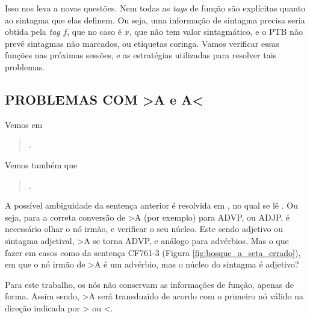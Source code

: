 Isso nos leva a novas questões. Nem todas as \textit{tags} de função são explícitas quanto ao sintagma que elas definem. Ou seja, uma informação de sintagma precisa seria obtida pela \textit{tag} $f$, que no caso é $x$, que não tem valor sintagmático, e o PTB não prevê sintagmas não marcados, ou etiquetas coringa. Vamos verificar essas funções nas próximas sessões, e as estratégias utilizadas para resolver tais problemas.

\subsection{PROBLEMAS COM >A e A<}
\label{subsec:bosque_a}

Vemos em \cite[p~13]{afonso2006arvores}
\begin{quote}
    . 
\end{quote}

Vemos também que 
\begin{quote}
    .
\end{quote}

A possível ambiguidade da sentença anterior é resolvida em \cite[p~58]{afonso2006arvores}, no qual se lê . Ou seja, para a correta conversão de >A (por exemplo) para ADVP, ou ADJP, é necessário olhar o nó irmão, e verificar o seu núcleo. Este sendo adjetivo ou sintagma adjetival, >A se torna ADVP, e análogo para advérbios. Mas o que fazer em casos como da sentença CF761-3 (Figura \ref{fig:bosque_a_seta_errado}), em que o nó irmão de >A é um advérbio, mas o núcleo do sintagma é adjetivo? 
\begin{center}
    
\end{center}
Para este trabalho, os nós não conservam as informações de função, apenas de forma. Assim sendo, >A será transduzido de acordo com o primeiro nó válido na direção indicada por > ou <.
